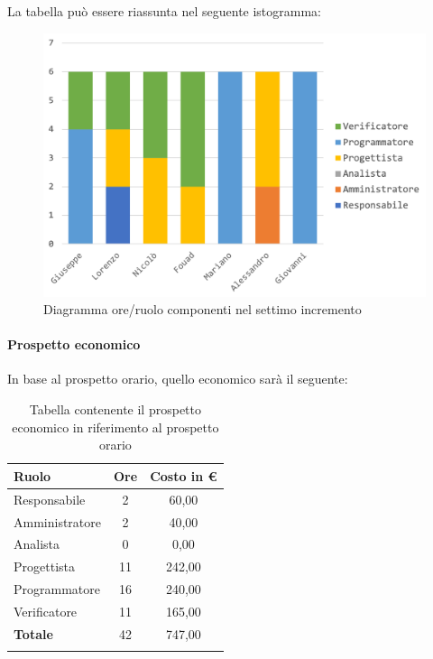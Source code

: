 			La tabella può essere riassunta nel seguente istogramma:
			\begin{figure}[H]
				\centering
				\includegraphics[width=0.8\linewidth]{./images/preventivo/incremento7-1.png}
				\caption{Diagramma ore/ruolo componenti nel settimo incremento}
				\label{fig:diagramma suddivione ruoli incremento VII}
			\end{figure}
			\pagebreak
			
			\paragraph{Prospetto economico}
			In base al prospetto orario, quello economico sarà il seguente: 
			
			\begin{longtable}{|l|c|c|}
				\hline
				\rowcolor{lighter-grayer}
				\textbf{Ruolo} & \textbf{Ore} & \textbf{Costo in € } \\
				\hline
				\endfirsthead
				
				\hline
				Responsabile 	    & 2 & 60,00\\
				\hline 
				\hline
				Amministratore	   & 2 & 40,00\\
				\hline
				\hline
				Analista 				 & 0 & 0,00\\
				\hline
				\hline
				Progettista 		   & 11 & 242,00\\
				\hline
				\hline
				Programmatore 	  & 16 & 240,00\\
				\hline
				\hline
				Verificatore 		   & 11 & 165,00\\
				\hline
				\textbf{Totale} 	 & 42 & 747,00\\
				\hline
				\caption{Tabella contenente il prospetto economico in riferimento al prospetto orario}
			\end{longtable}

